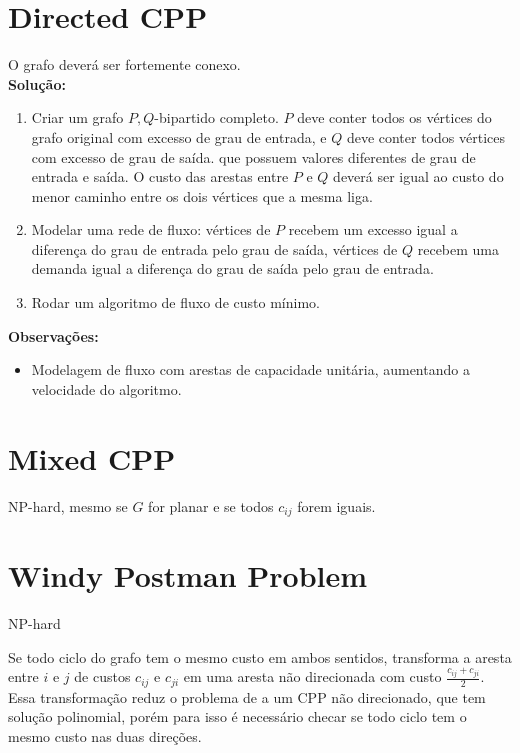 \documentclass{article}
\begin{document}
	\section{Directed CPP}

	O grafo deverá ser fortemente conexo.\\

	\textbf{Solução:}
	\begin{enumerate}
		\item Criar um grafo $P, Q$-bipartido completo. $P$ deve conter todos os vértices do grafo original com excesso de grau de entrada, e $Q$ deve conter todos vértices com excesso de grau de saída. que possuem valores diferentes de grau de entrada e saída. O custo das arestas entre $P$ e $Q$ deverá ser igual ao custo do menor caminho entre os dois vértices que a mesma liga.
		\item Modelar uma rede de fluxo: vértices de $P$ recebem um excesso igual a diferença do grau de entrada pelo grau de saída, vértices de $Q$ recebem uma demanda igual a diferença do grau de saída pelo grau de entrada. 
		\item Rodar um algoritmo de fluxo de custo mínimo. 
	\end{enumerate}

	\textbf{Observações:}
	\begin{itemize}
		\item Modelagem de fluxo com arestas de capacidade unitária, aumentando a velocidade do algoritmo.
	\end{itemize}

	\section{Mixed CPP}

	NP-hard, mesmo se $G$ for planar e se todos $c_{ij}$ forem iguais.

	\section{Windy Postman Problem}

	NP-hard

	Se todo ciclo do grafo tem o mesmo custo em ambos sentidos, transforma a aresta entre $i$ e $j$ de custos $c_{ij}$ e $c_{ji}$ em uma aresta não direcionada com custo $\frac{c_{ij} + c_{ji}}{2}$. Essa transformação reduz o problema de a um CPP não direcionado, que tem solução polinomial, porém para isso é necessário checar se todo ciclo tem o mesmo custo nas duas direções.
\end{document}
